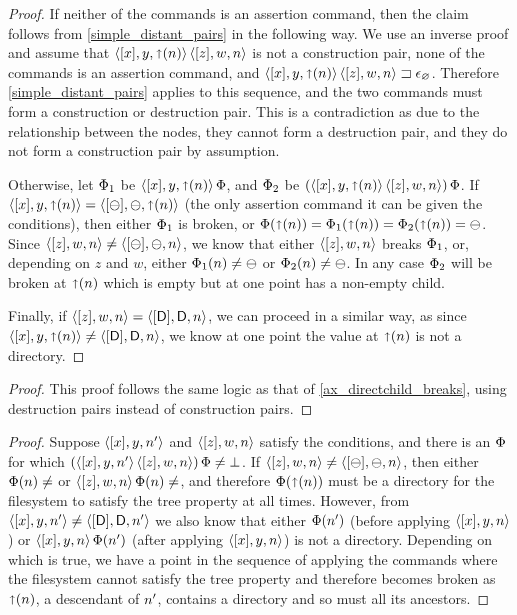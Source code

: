 \begin{proof}
If neither of the commands is an assertion command, then the claim follows from
\cref{simple_distant_pairs} in the following way.
We use an inverse proof and assume that $\langle{[x],y,\mathord{\shortuparrow}({n})}\rangle\,\langle{[z],w,n}\rangle$ is not a construction pair,
none of the commands is an assertion command, and ${\langle{[x],y,\mathord{\shortuparrow}({n})}\rangle\,\langle{[z],w,n}\rangle}\sqsupset\epsilon_\varnothing$.
Therefore \cref{simple_distant_pairs} applies to this sequence, and the two commands
must form a construction or destruction pair. This is a contradiction as due to
the relationship between the nodes, they cannot form a destruction pair, and
they do not form a construction pair by assumption.

Otherwise, let $\Phi_1$ be $\langle{[x],y,\mathord{\shortuparrow}({n})}\rangle\,\Phi$, and $\Phi_2$ be $(\langle{[x],y,\mathord{\shortuparrow}({n})}\rangle\,\langle{[z],w,n}\rangle)\,\Phi$.
If $\langle{[x],y,\mathord{\shortuparrow}({n})}\rangle=\langle{[\ominus],\ominus,\mathord{\shortuparrow}({n})}\rangle$ (the only assertion command it can be given the conditions),
then either $\Phi_1$ is broken, or
$\Phi(\mathord{\shortuparrow}({n}))=\Phi_1(\mathord{\shortuparrow}({n}))=\Phi_2(\mathord{\shortuparrow}({n}))=\ominus$.
Since $\langle{[z],w,n}\rangle\neq\langle{[\ominus],\ominus,n}\rangle$, we know that either $\langle{[z],w,n}\rangle$ breaks $\Phi_1$,
or, depending on $z$ and $w$, either $\Phi_1(n)\neq\ominus$ or $\Phi_2(n)\neq\ominus$.
In any case $\Phi_2$ will be broken at $\mathord{\shortuparrow}({n})$ which is empty but at one point has a non-empty child.

Finally, if $\langle{[z],w,n}\rangle=\langle{[\mathsf{D}],\mathsf{D},n}\rangle$, we can proceed in a similar way,
as since $\langle{[x],y,\mathord{\shortuparrow}({n})}\rangle\neq\langle{[\mathsf{D}],\mathsf{D},n}\rangle$, we know at one point the value at $\mathord{\shortuparrow}({n})$ is not a directory.
\end{proof}

\begin{myaxproof}
\axaxdirectparentbreaks
\end{myaxproof}

\begin{proof}
This proof follows the same logic as that of \cref{ax_directchild_breaks},
using destruction pairs instead of construction pairs.
\end{proof}

\begin{myaxproof}
\axaxdistantrelbreaks
\end{myaxproof}

\begin{proof}
Suppose $\langle{[x],y,n'}\rangle$ and $\langle{[z],w,n}\rangle$ satisfy the conditions,
and there is an $\Phi$ for which $(\langle{[x],y,n'}\rangle\,\langle{[z],w,n}\rangle)\,\Phi\neq\bot$.
If $\langle{[z],w,n}\rangle\neq\langle{[\ominus],\ominus,n}\rangle$, then either $\FS(n)\neq\empty$ or $\czwnv\aFS(n)\neq\empty$,
and therefore $\Phi(\mathord{\shortuparrow}({n}))$ must be a directory for the filesystem to satisfy
the tree property at all times.
However, from $\langle{[x],y,n'}\rangle\neq\langle{[\mathsf{D}],\mathsf{D},n'}\rangle$ we also know that either $\Phi(n')$ 
(before applying $\langle{[x],y,n}\rangle$) or $\langle{[x],y,n}\rangle\,\Phi(n')$ (after applying $\langle{[x],y,n}\rangle$)
is not a directory. Depending on which is true, we have a point in the sequence
of applying the commands where the filesystem cannot satisfy the tree property
and therefore becomes broken as $\mathord{\shortuparrow}({n})$, a descendant of $n'$, contains
a directory and so must all its ancestors.
\end{proof}

